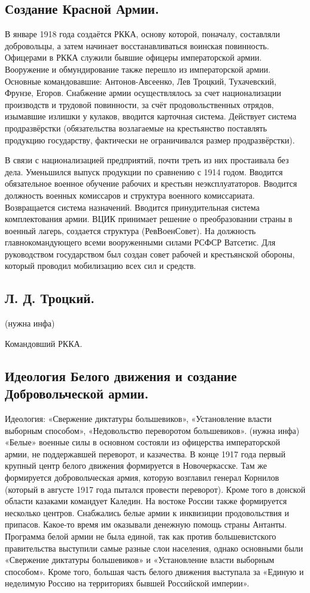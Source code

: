 \subsection{Создание Красной Армии.}

В январе 1918 года создаётся РККА, основу которой, поначалу, составляли добровольцы, а затем начинает восстанавливаться воинская повинность. Офицерами в РККА служили бывшие офицеры императорской армии. Вооружение и обмундирование также перешло из императорской армии. 
Основные командовавшие: Антонов-Авсеенко, Лев Троцкий, Тухачевский, Фрунзе, Егоров.
Снабжение армии осуществлялось за счет национализации производств и трудовой повинности, за счёт продовольственных отрядов, изымавшие излишки у кулаков, вводится карточная система. Действует система продразвёрстки (обязательства возлагаемые на крестьянство поставлять продукцию государству, фактически не ограничивался размер продразвёрстки).

В связи с национализацией предприятий, почти треть из них простаивала без дела. Уменьшился выпуск продукции по сравнению с 1914 годом.
Вводится обязательное военное обучение рабочих и крестьян неэксплуататоров. Вводится должность военных комиссаров и структура военного комиссариата. Возвращается система назначений. Вводится принудительная система комплектования армии.
ВЦИК принимает решение о преобразовании страны в военный лагерь, создается структура (РевВоенСовет). На должность главнокомандующего всеми вооруженными силами РСФСР Ватсетис. Для руководством государством был создан совет рабочей и крестьянской обороны, который проводил мобилизацию всех сил и средств.

\subsection{Л. Д. Троцкий.} (нужна инфа)

Командовший РККА.

\subsection{Идеология Белого движения и создание Добровольческой армии.}

Идеология: «Свержение диктатуры большевиков», «Установление власти выборным способом», «Недовольство переворотом большевиков». (нужна инфа)
«Белые» военные силы в основном состояли из офицерства императорской армии, не поддержавшей переворот, и казачества. В конце 1917 года первый крупный центр белого движения формируется в Новочеркасске. Там же формируется добровольческая армия, которую возглавил генерал Корнилов (который в августе 1917 года пытался провести переворот). Кроме того в донской области казаками командует Каледин. На востоке России также формируется несколько центров.
Снабжались белые армии к инквизиции продовольствия и припасов. Какое-то время им оказывали денежную помощь страны Антанты.
Программа белой армии не была единой, так как против большевистского правительства выступили самые разные слои населения, однако основными были «Свержение диктатуры большевиков» и «Установление власти выборным способом». Кроме того, большая часть белого движения выступала за «Единую и неделимую Россию на территориях бывшей Российской	 империи».

